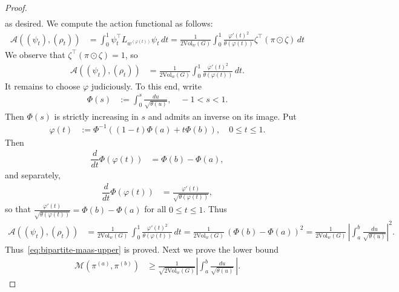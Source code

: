 \documentclass[11pt,a4paper]{article}
\newcommand{\Maas}{\mathcal{M}}
\newcommand{\Vol}{\mathrm{Vol}}
\begin{document}
\begin{proof}
\begin{align*}
        \end{align*}
    as desired. We compute the action functional as follows:
        \begin{align*}
            \mathcal{A}((\psi_t), (\rho_t)) &= \int_0^1 \psi_t^\top L_{w^{(\varphi(t))}} \psi_t\, dt = \frac{1}{2\Vol_w(G)}\int_0^1 \frac{\varphi'(t)^2}{\theta(\varphi(t))} \zeta^\top (\pi\odot \zeta) \, dt
        \end{align*}
    We observe that $ \zeta^\top (\pi\odot \zeta) = 1$, so 
        \begin{align*}
            \mathcal{A}((\psi_t), (\rho_t)) &= \frac{1}{2\Vol_w(G)}\int_0^1 \frac{\varphi'(t)^2}{\theta(\varphi(t))} \, dt.
        \end{align*}
    It remains to choose $\varphi$ judiciously. To this end, write
        \begin{align*}
            \Phi(s) &:= \int_0^{s} \frac{du}{\sqrt{\theta(u)}},\quad -1<s<1.
        \end{align*}    
    Then $\Phi(s)$ is strictly increasing in $s$ and admits an inverse on its image. Put
        \begin{align*}
            \varphi(t) &:= \Phi^{-1}((1-t)\Phi(a) + t\Phi(b)),\quad 0\le t\le 1.
        \end{align*}
    Then 
        \begin{align*}
            \dfrac{d}{dt} \Phi(\varphi(t)) &= \Phi(b) - \Phi(a),
        \end{align*}
    and separately,
        \begin{align*}
            \dfrac{d}{dt} \Phi(\varphi(t)) &= \frac{\varphi'(t)}{\sqrt{\theta(\varphi(t))}},
        \end{align*}
    so that $\frac{\varphi'(t)}{\sqrt{\theta(\varphi(t))}} = \Phi(b) - \Phi(a)$ for all $0\le t\le 1$. Thus
        \begin{align*}
            \mathcal{A}((\psi_t), (\rho_t)) &= \frac{1}{2\Vol_w(G)}\, \int_0^1 \frac{\varphi'(t)^2}{\theta(\varphi(t))} \, dt = \frac{1}{2\Vol_w(G)}\, (\Phi(b) - \Phi(a))^2 = \frac{1}{2\Vol_w(G)}\, \left| \int_a^{b} \frac{du}{\sqrt{\theta(u)}}\right|^2.
        \end{align*}
    Thus~\cref{eq:bipartite-maas-upper} is proved. Next we prove the lower bound
        \begin{align}\label{eq:bipartite-maas-lower}
            \Maas(\pi^{(a)},\pi^{(b)}) &\geq \frac{1}{\sqrt{2\Vol_w(G)}} \left| \int_a^{b} \frac{du}{\sqrt{\theta(u)}}\,\right|.
        \end{align}

\end{proof}
\end{document}
